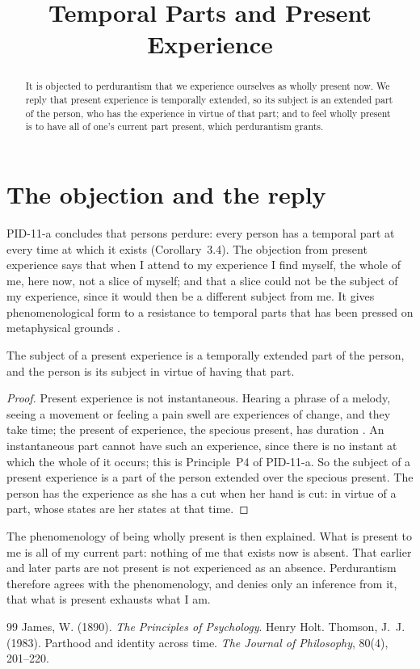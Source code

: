\documentclass{situationist-preprint}
\title{Temporal Parts and Present Experience}
\begin{document}
\maketitle

\begin{abstract}
It is objected to perdurantism that we experience ourselves as wholly present now. We reply that present experience is temporally extended, so its subject is an extended part of the person, who has the experience in virtue of that part; and to feel wholly present is to have all of one's current part present, which perdurantism grants.
\end{abstract}

\section{The objection and the reply}

PID-11-a concludes that persons perdure: every person has a temporal part at every time at which it exists (Corollary~3.4). The objection from present experience says that when I attend to my experience I find myself, the whole of me, here now, not a slice of myself; and that a slice could not be the subject of my experience, since it would then be a different subject from me. It gives phenomenological form to a resistance to temporal parts that has been pressed on metaphysical grounds \citep{Thomson1983}.

\begin{proposition}\label{p:ext}
The subject of a present experience is a temporally extended part of the person, and the person is its subject in virtue of having that part.
\end{proposition}

\begin{proof}
Present experience is not instantaneous. Hearing a phrase of a melody, seeing a movement or feeling a pain swell are experiences of change, and they take time; the present of experience, the specious present, has duration \citep[ch.~15]{James1890}. An instantaneous part cannot have such an experience, since there is no instant at which the whole of it occurs; this is Principle~P4 of PID-11-a. So the subject of a present experience is a part of the person extended over the specious present. The person has the experience as she has a cut when her hand is cut: in virtue of a part, whose states are her states at that time.
\end{proof}

The phenomenology of being wholly present is then explained. What is present to me is all of my current part: nothing of me that exists now is absent. That earlier and later parts are not present is not experienced as an absence. Perdurantism therefore agrees with the phenomenology, and denies only an inference from it, that what is present exhausts what I am.

\begin{thebibliography}{99}\small
{} James, W. (1890). \emph{The Principles of Psychology}. Henry Holt.
 Thomson, J.~J. (1983). Parthood and identity across time. \emph{The Journal of Philosophy}, 80(4), 201--220.
\end{thebibliography}
\end{document}
